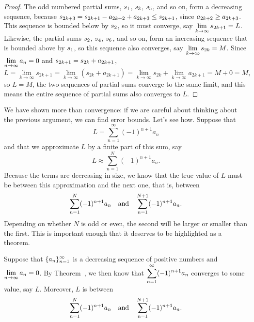 

\begin{proof} The odd numbered partial sums, $\displaystyle s_1$, $\displaystyle s_3$, $\displaystyle s_5$,
and so on, form a decreasing sequence, because
$\displaystyle s_{2k+3}=s_{2k+1}-a_{2k+2}+a_{2k+3}\le s_{2k+1}$, since
$\displaystyle a_{2k+2}\ge a_{2k+3}$. This sequence is bounded below by
$\displaystyle s_2$, so it must converge, say 
$\displaystyle\lim_{k\to\infty}s_{2k+1}=L$.
Likewise, the partial sums $\displaystyle s_2$, $\displaystyle s_4$, $\displaystyle s_6$,
and so on, form an increasing sequence that is bounded above by
$\displaystyle s_1$, so this sequence also converges, say 
$\displaystyle\lim_{k\to\infty}s_{2k}=M$. Since $\displaystyle\lim_{n\to\infty} a_n=0$ and
$\displaystyle s_{2k+1}= s_{2k}+a_{2k+1}$,
$$
  L=\lim_{k\to\infty}s_{2k+1}=\lim_{k\to\infty}(s_{2k}+a_{2k+1})=
  \lim_{k\to\infty}s_{2k}+\lim_{k\to\infty}a_{2k+1}=M+0=M,
$$
so $L=M$, the two sequences of partial sums converge to the same
limit, and this means the entire sequence of partial sums also
converges to $L$.
\end{proof}

We have shown more than convergence: if we are careful about thinking
about the previous argument, we can find error bounds. Let's see
how. Suppose that
$$L=\sum_{n=1}^\infty (-1)^{n+1} a_n$$
and that we approximate $L$ by a finite part of this sum, say
$$L\approx \sum_{n=1}^N (-1)^{n+1} a_n.$$
Because the terms are decreasing in size, we know that the true value
of $L$ must be between this approximation and the next one, that is,
between 
$$
  \sum_{n=1}^N (-1)^{n+1} a_n \hbox{\quad and\quad}
  \sum_{n=1}^{N+1} (-1)^{n+1} a_n.
$$
Depending on whether $N$ is odd or even, the second will be larger or
smaller than the first.  This is important enough that it deserves to
be highlighted as a theorem.

\begin{theorem}
\label{thm:alternating-series-error-bounds}
  Suppose that $\displaystyle\{a_n\}_{n=1}^\infty$ is a decreasing sequence of
  positive numbers and $\displaystyle\lim_{n\to\infty}a_n=0$. By
  Theorem~, we then know that
  $\displaystyle\sum_{n=1}^\infty (-1)^{n+1} a_n$ converges to some value, say
  $L$.  Moreover, $L$ is between
  $$
  \sum_{n=1}^N (-1)^{n+1} a_n \hbox{\quad and\quad}
  \sum_{n=1}^{N+1} (-1)^{n+1} a_n.
  $$
\end{theorem}




